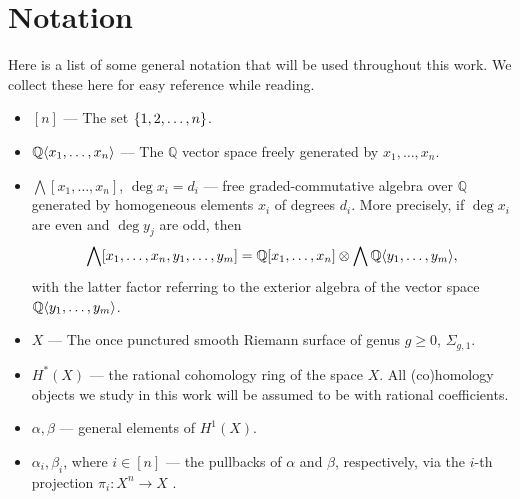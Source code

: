 \documentclass[11pt,reqno]{amsproc}
\numberwithin{equation}{section}
\theoremstyle{definition}
\theoremstyle{remark}
\newcommand\Q{{\mathbb Q}}
\DeclarePairedDelimiter{\set}{\{}{\}}
\DeclarePairedDelimiter{\pairing}{\langle}{\rangle}
\newcommand{\defn}{\textbf}
\newcommand{\YH}[1]{{{\color{blue}{#1}}}}
\begin{document}
\section*{Notation}

Here is a list of some general notation that will be used throughout this work. We collect these here for easy reference while reading.\\


\begin{itemize}
\item $[n]$ --- The set $\set{1,2,\dots,n}$.\\



\item $\Q \pairing{x_1,\dots,x_n}$ --- The $\Q$ vector space freely generated by $x_1,\dots,x_n$.\\

\item $\bigwedge[x_1,\dots,x_n]$, $\deg x_i=d_i$ --- free graded-commutative algebra over $\Q$ generated by homogeneous elements $x_i$ of degrees $d_i$. More precisely, if $\deg x_i$ are even and $\deg y_j$ are odd, then
\[ \bigwedge[x_1,\dots,x_n,y_1,\dots,y_m] = \Q[x_1,\dots,x_n]\otimes \bigwedge \Q\pairing{y_1,\dots,y_m},\]
with the latter factor referring to the exterior algebra of the vector space $\Q\pairing{y_1,\dots,y_m}$.\\

\item $X$ --- The once punctured smooth Riemann surface of genus $g\geq 0$, $\Sigma_{g,1}$.\\

\item $H^*(X)$ --- the rational cohomology ring of the space $X$. All (co)homology objects we study in this work will be assumed to be with rational coefficients.\\

\item $\alpha, \beta$ --- general elements of $H^1(X)$.\\

\item $\alpha_i, \beta_i$, where $i \in [n]$ --- the pullbacks of $\alpha$ and $\beta$, respectively, via the $i$-th projection $\pi_i: X^n\to X$ .\\


\end{itemize}
\end{document}
